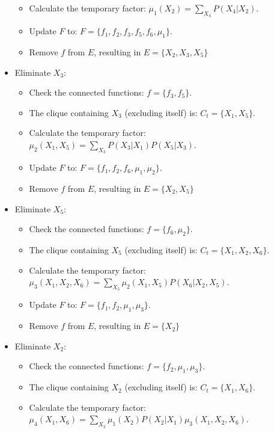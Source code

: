 \begin{example}
\begin{itemize}
\begin{itemize}
                \item Calculate the temporary factor: $\mu_1(X_2)=\sum_{X_4}P(X_4|X_2)$. 
                \item Update $F$ to: $F=\{f_1,f_2,f_3,f_5,f_6,\mu_1\}$. 
                \item Remove $f$ from $E$, resulting in $E=\{X_2,X_3,X_5\}$
            \end{itemize}
        \item Eliminate $X_3$: 
            \begin{itemize}
                \item Check the connected functions: $f=\{f_3,f_5\}$. 
                \item The clique containing $X_3$ (excluding itself) is: $C_t=\{X_1,X_5\}$. 
                \item Calculate the temporary factor: $\mu_2(X_1,X_5)=\sum_{X_3}P(X_3|X_1)P(X_5|X_3)$. 
                \item Update $F$ to: $F=\{f_1,f_2,f_6,\mu_1,\mu_2\}$. 
                \item Remove $f$ from $E$, resulting in $E=\{X_2,X_5\}$
            \end{itemize}
        \item Eliminate $X_5$: 
            \begin{itemize}
                \item Check the connected functions: $f=\{f_6,\mu_2\}$. 
                \item The clique containing $X_5$ (excluding itself) is: $C_t=\{X_1,X_2,X_6\}$. 
                \item Calculate the temporary factor: $\mu_3(X_1,X_2,X_6)=\sum_{X_5}\mu_2(X_1,X_5)P(X_6|X_2,X_5)$. 
                \item Update $F$ to: $F=\{f_1,f_2,\mu_1,\mu_3\}$. 
                \item Remove $f$ from $E$, resulting in $E=\{X_2\}$
            \end{itemize}
        \item Eliminate $X_2$: 
            \begin{itemize}
                \item Check the connected functions: $f=\{f_2,\mu_1,\mu_3\}$. 
                \item The clique containing $X_2$ (excluding itself) is: $C_t=\{X_1,X_6\}$. 
                \item Calculate the temporary factor: $\mu_4(X_1,X_6)=\sum_{X_2}\mu_1(X_2)P(X_2|X_1)\mu_3(X_1,X_2,X_6)$. 

\end{itemize}
\end{itemize}
\end{example}
